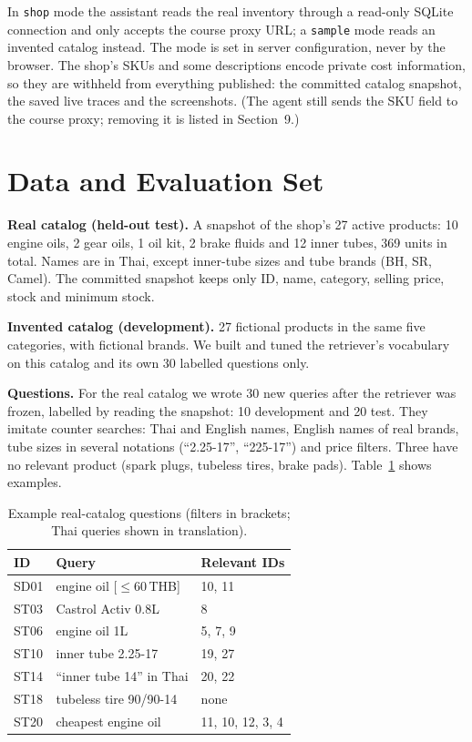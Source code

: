 \documentclass[10pt,twocolumn,a4paper]{article}
\newcommand{\code}[1]{\texttt{#1}}
\begin{document}
In \code{shop} mode the assistant reads the real inventory through a read-only SQLite connection \cite{sqlite} and only accepts the course proxy URL; a \code{sample} mode reads an invented catalog instead. The mode is set in server configuration, never by the browser. The shop's SKUs and some descriptions encode private cost information, so they are withheld from everything published: the committed catalog snapshot, the saved live traces and the screenshots. (The agent still sends the SKU field to the course proxy; removing it is listed in Section~9.)

\section{Data and Evaluation Set}

\textbf{Real catalog (held-out test).} A snapshot of the shop's 27 active products: 10 engine oils, 2 gear oils, 1 oil kit, 2 brake fluids and 12 inner tubes, 369 units in total. Names are in Thai, except inner-tube sizes and tube brands (BH, SR, Camel). The committed snapshot keeps only ID, name, category, selling price, stock and minimum stock.

\textbf{Invented catalog (development).} 27 fictional products in the same five categories, with fictional brands. We built and tuned the retriever's vocabulary on this catalog and its own 30 labelled questions only.

\textbf{Questions.} For the real catalog we wrote 30 new queries after the retriever was frozen, labelled by reading the snapshot: 10 development and 20 test. They imitate counter searches: Thai and English names, English names of real brands, tube sizes in several notations (``2.25-17'', ``225-17'') and price filters. Three have no relevant product (spark plugs, tubeless tires, brake pads). Table~\ref{tab:examples} shows examples.

\begin{table}[t]
\caption{Example real-catalog questions (filters in brackets; Thai queries shown in translation).}
\label{tab:examples}
\centering\small
\begin{tabular}{@{}lp{38mm}l@{}}
\toprule
ID & Query & Relevant IDs \\
\midrule
SD01 & engine oil [$\le$60\,THB] & 10, 11 \\
ST03 & Castrol Activ 0.8L & 8 \\
ST06 & engine oil 1L & 5, 7, 9 \\
ST10 & inner tube 2.25-17 & 19, 27 \\
ST14 & ``inner tube 14'' in Thai & 20, 22 \\
ST18 & tubeless tire 90/90-14 & none \\
ST20 & cheapest engine oil & 11, 10, 12, 3, 4 \\
\bottomrule
\end{tabular}
\end{table}
\end{document}
